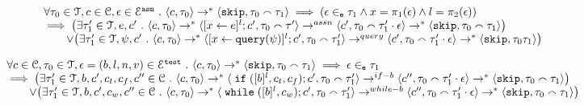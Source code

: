 %
\begin{lem}
\label{lem:inv_asn}
\[
\begin{array}{l}
	\forall \mathtt{\tau}_0 \in \mathcal{T}, c \in \mathcal{C},
	\mathtt{\epsilon} \in \mathcal{E}^{\mathtt{{asn}}} ~.~
	\langle c, \mathtt{\tau}_0 \rangle \rightarrow^* \langle \mathtt{skip}, \mathtt{\tau}_0 \smallfrown \mathtt{\tau}_1 \rangle \implies
	(\mathtt{\epsilon} \in_{\mathtt{e}} \mathtt{\tau}_1 \land	x = \pi_1(\mathtt{\epsilon}) \land l = \pi_2(\mathtt{\epsilon}))
	\\ 
	\implies 
	\big( 
		\exists \mathtt{\tau}_1' \in \mathcal{T}, e, c' ~.~
		\langle c, \mathtt{\tau}_0 \rangle \rightarrow^* \langle  [\mathrel{ x \leftarrow e }]^l;c', \mathtt{\tau}_0  \smallfrown  \mathtt{\tau}' \rangle \rightarrow^{assn}
		\langle c', \mathtt{\tau}_0 \smallfrown \mathtt{\tau}_1'\cdot \mathtt{\epsilon} \rangle \rightarrow^{*}
		\langle \mathtt{skip}, \mathtt{\tau}_0  \smallfrown  \mathtt{\tau}_1 \rangle
	\big)
	\\ \qquad \lor
	\big( 
		\exists \mathtt{\tau}_1' \in \mathcal{T}, \psi, c' ~.~
		\langle c, \mathtt{\tau}_0 \rangle \rightarrow^* \langle  [\mathrel{ x \leftarrow {\tt query}(\psi) }]^l;c', \mathtt{\tau}_0 \smallfrown \mathtt{\tau}_1' \rangle \rightarrow^{query}
		\langle c', \mathtt{\tau}_0  \smallfrown  \mathtt{\tau}_1' \cdot \mathtt{\epsilon}  \rangle \rightarrow^{*}
		\langle  \mathtt{skip}, \mathtt{\tau}_0\mathtt{\tau}_1 \rangle
	\big)
\end{array}
\]
%
\end{lem}
%
\begin{lem}
\label{lem:inv_test}
\[
\begin{array}{l}
	\forall c\in \mathcal{C}, \mathtt{\tau}_0 \in \mathcal{T}, \mathtt{\epsilon} = (b, l, n, v) \in \mathcal{E}^{\mathtt{{test}}} ~.~
	 \langle c, \mathtt{\tau}_0 \rangle \rightarrow^* \langle \mathtt{skip}, \mathtt{\tau}_0 \smallfrown \mathtt{\tau}_1 \rangle
	\implies  \mathtt{\epsilon} \in_{\mathtt{e}} \mathtt{\tau}_1 \\
	\implies 
	\big( 
		\exists \mathtt{\tau}_1' \in \mathcal{T}, b, c', c_t, c_f, c'' \in \mathcal{C} ~.~
		\langle c, \mathtt{\tau}_0 \rangle \rightarrow^* \langle \;\mathtt{if}\; ([b]^l, c_t, c_f);c', \mathtt{\tau}_0 \smallfrown \mathtt{\tau}_1' \rangle \rightarrow^{if-b}
		\langle c'', \mathtt{\tau}_0 \smallfrown \mathtt{\tau}_1'\cdot \mathtt{\epsilon}  \rangle \rightarrow^{*}
		\langle \mathtt{skip}, \mathtt{\tau}_0 \smallfrown \mathtt{\tau}_1 \rangle 
	\big)
	\\ \qquad \lor
	\big( 
		\exists \mathtt{\tau}_1' \in \mathcal{T}, b, c', c_w, c'' \in \mathcal{C} ~.~
		\langle c, \mathtt{\tau}_0 \rangle \rightarrow^* \langle  \;\mathtt{while}\;([b]^l, c_w);c', \mathtt{\tau}_0 \smallfrown  \mathtt{\tau}_1' \rangle \rightarrow^{while-b}
		\langle c'', \mathtt{\tau}_0 \smallfrown \mathtt{\tau}_1'\cdot \mathtt{\epsilon}  \rangle \rightarrow^{*}
		\langle \mathtt{skip}, \mathtt{\tau}_0  \smallfrown \mathtt{\tau}_1 \rangle
	\big)
\end{array}
\]
\end{lem}

